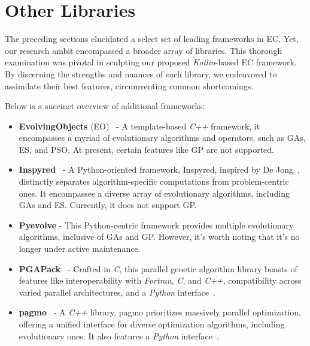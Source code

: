 \section{Other Libraries}
\label{sec:sota:other}
  The preceding sections elucidated a select set of leading frameworks in 
  EC.
  Yet, our research ambit encompassed a broader array of libraries.
  This thorough examination was pivotal in sculpting our proposed
  \textit{Kotlin}-based EC framework.
  By discerning the strengths and nuances of each library, we endeavored to 
  assimilate their best features, circumventing common shortcomings.

  Below is a succinct overview of additional frameworks:

  \begin{itemize}
    \item \textbf{EvolvingObjects} (EO)~\autocite{EvolvingObjectsWelcomeEvolving} - 
      A template-based \textit{C++} framework, it encompasses a myriad of evolutionary algorithms and operators, such as GAs, ES, and PSO.
      At present, certain features like GP are not supported.
    \item \textbf{Inspyred}~\autocite{InspyredBioinspiredAlgorithms} - 
      A Python-oriented framework, Inspyred, inspired by De Jong~\autocite{dejongEvolutionaryComputationUnified2006},
      distinctly separates algorithm-specific computations from problem-centric 
      ones.
      It encompasses a diverse array of evolutionary algorithms, including GAs 
      and ES.
      Currently, it does not support GP.
    \item \textbf{Pyevolve} - This Python-centric framework provides multiple 
      evolutionary algorithms, inclusive of GAs and GP.
      However, it's worth noting that it's no longer under active maintenance.
    \item \textbf{PGAPack}~\autocite{SchlatterbeckPgapackParallel} - 
      Crafted in \textit{C}, this parallel genetic algorithm library boasts of 
      features like interoperability with \textit{Fortran}, \textit{C}, and 
      \textit{C++}, compatibility across varied parallel architectures, and a 
      \textit{Python} interface~\autocite{SchlatterbeckPgapyPythona}.
    \item \textbf{pagmo}~\autocite{Pagmo2023} - 
      A \textit{C++} library, pagmo prioritizes massively parallel optimization, 
      offering a unified interface for diverse optimization algorithms, 
      including evolutionary ones.
      It also features a \textit{Python} interface~\autocite{Pygmo2023}.

\end{itemize}
